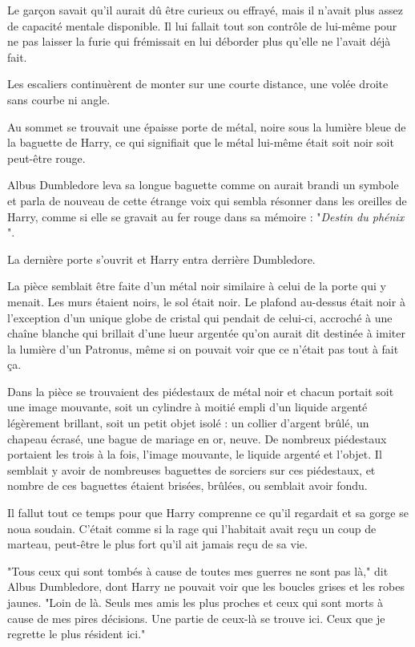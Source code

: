 Le garçon savait qu'il aurait dû être curieux ou effrayé, mais il n'avait plus assez de capacité mentale disponible. Il lui fallait tout son contrôle de lui-même pour ne pas laisser la furie qui frémissait en lui déborder plus qu'elle ne l'avait déjà fait.

Les escaliers continuèrent de monter sur une courte distance, une volée droite sans courbe ni angle.

Au sommet se trouvait une épaisse porte de métal, noire sous la lumière bleue de la baguette de Harry, ce qui signifiait que le métal lui-même était soit noir soit peut-être rouge.

Albus Dumbledore leva sa longue baguette comme on aurait brandi un symbole et parla de nouveau de cette étrange voix qui sembla résonner dans les oreilles de Harry, comme si elle se gravait au fer rouge dans sa mémoire : "\emph{Destin du phénix} ".

La dernière porte s'ouvrit et Harry entra derrière Dumbledore.

La pièce semblait être faite d'un métal noir similaire à celui de la porte qui y menait. Les murs étaient noirs, le sol était noir. Le plafond au-dessus était noir à l'exception d'un unique globe de cristal qui pendait de celui-ci, accroché à une chaîne blanche qui brillait d'une lueur argentée qu'on aurait dit destinée à imiter la lumière d'un Patronus, même si on pouvait voir que ce n'était pas tout à fait ça.

Dans la pièce se trouvaient des piédestaux de métal noir et chacun portait soit une image mouvante, soit un cylindre à moitié empli d'un liquide argenté légèrement brillant, soit un petit objet isolé : un collier d'argent brûlé, un chapeau écrasé, une bague de mariage en or, neuve. De nombreux piédestaux portaient les trois à la fois, l'image mouvante, le liquide argenté et l'objet. Il semblait y avoir de nombreuses baguettes de sorciers sur ces piédestaux, et nombre de ces baguettes étaient brisées, brûlées, ou semblait avoir fondu.

Il fallut tout ce temps pour que Harry comprenne ce qu'il regardait et sa gorge se noua soudain. C'était comme si la rage qui l'habitait avait reçu un coup de marteau, peut-être le plus fort qu'il ait jamais reçu de sa vie.

"Tous ceux qui sont tombés à cause de toutes mes guerres ne sont pas là," dit Albus Dumbledore, dont Harry ne pouvait voir que les boucles grises et les robes jaunes. "Loin de là. Seuls mes amis les plus proches et ceux qui sont morts à cause de mes pires décisions. Une partie de ceux-là se trouve ici. Ceux que je regrette le plus résident ici."


